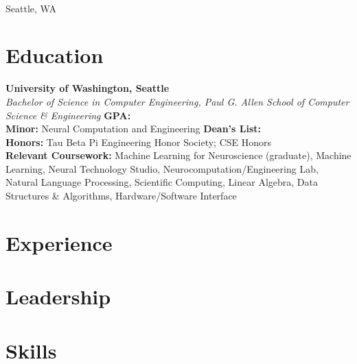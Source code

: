 \documentclass[10pt, letterpaper]{article}
\begin{document}
\begin{center}
    \fontsize{12pt}{12pt}\selectfont \textbf{\myName}\\
    Seattle, WA \textbar\ \href{mailto:\myEmail}{\myEmail} \textbar\ \myPhone\ \textbar\ \href{https://\myLinkedIn}{\myLinkedIn} \textbar\ \href{https://\myGitHub}{\myGitHub}
\end{center}

\section{Education}
\textbf{University of Washington, Seattle} \hfill \textit{\myGradYear}\\
\textit{Bachelor of Science in Computer Engineering, Paul G. Allen School of Computer Science \& Engineering} \hfill \textbf{GPA: \myGPA}\\
\textbf{Minor:} Neural Computation and Engineering \hfill \textbf{Dean's List:} \myDeansList\\
\textbf{Honors:} Tau Beta Pi Engineering Honor Society; CSE Honors\\
\textbf{Relevant Coursework:} Machine Learning for Neuroscience (graduate), Machine Learning, Neural Technology Studio, Neurocomputation/Engineering Lab, Natural Language Processing, Scientific Computing, Linear Algebra, Data Structures \& Algorithms, Hardware/Software Interface

\section{Experience}


\section{Leadership}


\section{Skills}

\end{document}
